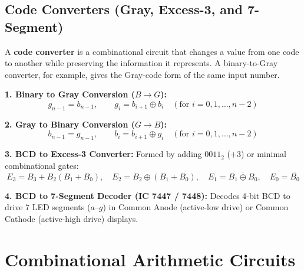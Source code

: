 \documentclass[12pt,a4paper]{article}
\begin{document}
\subsection{Code Converters (Gray, Excess-3, and 7-Segment)}
\begin{tcolorbox}[defbox, title={Code Converter}]
A \textbf{code converter} is a combinational circuit that changes a value from one code to another while preserving the information it represents. A binary-to-Gray converter, for example, gives the Gray-code form of the same input number.
\end{tcolorbox}

\begin{tcolorbox}[formulabox, title={\textbf{Code Conversion Logic and Formulas}}]
\textbf{1. Binary to Gray Conversion ($B \to G$):}
\begin{equation}
  g_{n-1} = b_{n-1}, \qquad g_i = b_{i+1} \oplus b_i \quad (\text{for } i = 0, 1, \dots, n-2)
\end{equation}

\textbf{2. Gray to Binary Conversion ($G \to B$):}
\begin{equation}
  b_{n-1} = g_{n-1}, \qquad b_i = b_{i+1} \oplus g_i \quad (\text{for } i = 0, 1, \dots, n-2)
\end{equation}

\textbf{3. BCD to Excess-3 Converter:} Formed by adding $0011_2$ ($+3$) or minimal combinational gates:
\begin{equation}
  E_3 = B_3 + B_2(B_1 + B_0), \quad E_2 = B_2 \oplus (B_1 + B_0), \quad E_1 = \overline{B_1 \oplus B_0}, \quad E_0 = \overline{B_0}
\end{equation}

\textbf{4. BCD to 7-Segment Decoder (IC 7447 / 7448):} Decodes 4-bit BCD to drive 7 LED segments ($a\text{--}g$) in Common Anode (active-low drive) or Common Cathode (active-high drive) displays.
\end{tcolorbox}

\section{Combinational Arithmetic Circuits}
\end{document}
